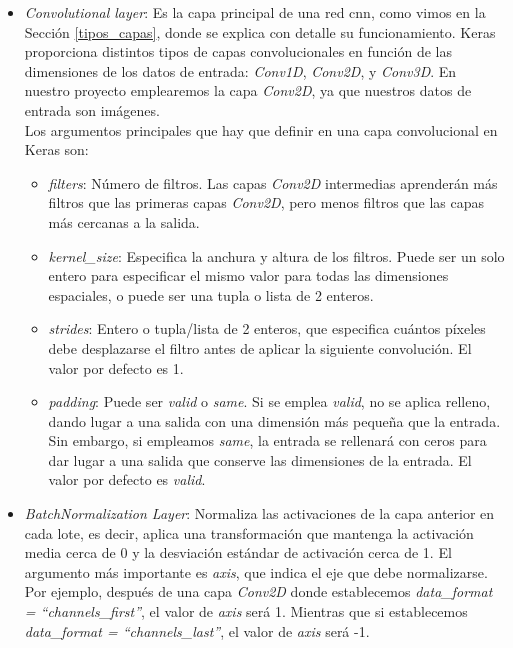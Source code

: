 \begin{itemize}
    \item \textit{Convolutional layer}: Es la capa principal de una red \acrshort{cnn}, como vimos en la Sección \ref{tipos_capas}, donde se explica con detalle su funcionamiento. Keras proporciona distintos tipos de capas convolucionales en función de las dimensiones de los datos de entrada: \textit{Conv1D}, \textit{Conv2D}, y \textit{Conv3D}. En nuestro proyecto emplearemos la capa \textit{Conv2D}, ya que nuestros datos de entrada son imágenes.\\
    
    Los argumentos principales que hay que definir en una capa convolucional en Keras son:
    
        \begin{itemize}
            \item \textit{filters}: Número de filtros. Las capas \textit{Conv2D} intermedias aprenderán más filtros que las primeras capas \textit{Conv2D}, pero menos filtros que las capas más cercanas a la salida. 
            
            \item \textit{kernel\_size}: Especifica la anchura y altura de los filtros. Puede ser un solo entero para especificar el mismo valor para todas las dimensiones espaciales, o puede ser una tupla o lista de 2 enteros.
            
            \item \textit{strides}: Entero o tupla/lista de 2 enteros, que especifica cuántos píxeles debe desplazarse el filtro antes de aplicar la siguiente convolución. El valor por defecto es 1.
            
            \item \textit{padding}: Puede ser \textit{valid} o \textit{same}. Si se emplea \textit{valid}, no se aplica relleno, dando lugar a una salida con una dimensión más pequeña que la entrada. Sin embargo, si empleamos \textit{same}, la entrada se rellenará con ceros para dar lugar a una salida que conserve las dimensiones de la entrada. El valor por defecto es \textit{valid}.

        \end{itemize}
    
    \item \textit{BatchNormalization Layer}: Normaliza las activaciones de la capa anterior en cada lote, es decir, aplica una transformación que mantenga la activación media cerca de 0 y la desviación estándar de activación cerca de 1. El argumento más importante es \textit{axis}, que indica el eje que debe normalizarse. Por ejemplo, después de una capa \textit{Conv2D} donde establecemos \textit{data\_format = ``channels\_first''}, el valor de \textit{axis} será 1. Mientras que si establecemos \textit{data\_format = ``channels\_last''}, el valor de \textit{axis} será -1.
    

\end{itemize}
